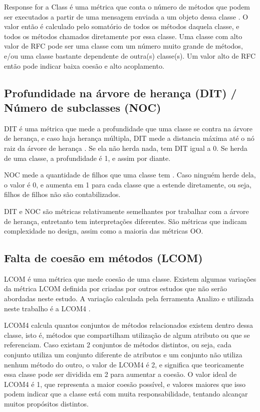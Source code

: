 Response for a Class é uma métrica que conta o número de métodos que podem ser executados a partir de uma mensagem enviada a um objeto dessa classe \cite{chidamberkemerer}. O valor então é calculado pelo somatório de todos os métodos daquela classe, e todos os métodos chamados diretamente por essa classe. Uma classe com alto valor de RFC pode ser uma classe com um número muito grande de métodos, e/ou uma classe bastante dependente de outra(s) classe(s). Um valor alto de RFC então pode indicar baixa coesão e alto acoplamento. 

\subsection{Profundidade na árvore de herança (DIT) / Número de subclasses (NOC)}

DIT é uma métrica que mede a profundidade que uma classe se contra na árvore de herança, e caso haja herança múltipla, DIT mede a distancia máxima até o nó raiz da árvore de herança \cite{chidamberkemerer}. Se ela não herda nada, tem DIT igual a 0. Se herda de uma classe, a profundidade é 1, e assim por diante. 

NOC mede a quantidade de filhos que uma classe tem \cite{chidamberkemerer}. Caso ninguém herde dela, o valor é 0, e aumenta em 1 para cada classe que a estende diretamente, ou seja, filhos de filhos não são contabilizados.

DIT e NOC são métricas relativamente semelhantes por trabalhar com a árvore de herança, entretanto tem interpretações diferentes. São métricas que indicam complexidade no design, assim como a maioria das métricas OO.

\subsection{Falta de coesão em métodos (LCOM)}

LCOM é uma métrica que mede coesão de uma classe. Existem algumas variações da métrica LCOM definida por  criadas por outros estudos que não serão abordadas neste estudo. A variação calculada pela ferramenta Analizo e utilizada neste trabalho é a LCOM4 \cite{hitz1995measuring}.

LCOM4 calcula quantos conjuntos de métodos relacionados existem dentro dessa classe, isto é, métodos que compartilham utilização de algum atributo ou que se referenciam. Caso existam 2 conjuntos de métodos distintos, ou seja, cada conjunto utiliza um conjunto diferente de atributos e um conjunto não utiliza nenhum método do outro, o valor de LCOM4 é 2, e significa que teoricamente essa classe pode ser dividida em 2 para aumentar a coesão. O valor ideal de LCOM4 é 1, que representa a maior coesão possível, e valores maiores que isso podem indicar que a classe está com muita responsabilidade, tentando alcançar muitos propósitos distintos.

